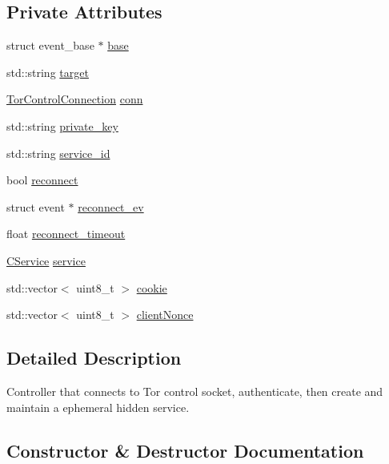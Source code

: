 \subsection*{Private Attributes}
\begin{DoxyCompactItemize}
\item 
struct event\+\_\+base $\ast$ \mbox{\hyperlink{class_tor_controller_a490cb6f1e683bbff4a6da80f054a1f14}{base}}
\item 
std\+::string \mbox{\hyperlink{class_tor_controller_ae082deff33f6f1db7e51825113c1adab}{target}}
\item 
\mbox{\hyperlink{class_tor_control_connection}{Tor\+Control\+Connection}} \mbox{\hyperlink{class_tor_controller_a0cd0abc08230a17743b1bfa22196a7ed}{conn}}
\item 
std\+::string \mbox{\hyperlink{class_tor_controller_aea1fe61c7404d74ccfaf1e875737e043}{private\+\_\+key}}
\item 
std\+::string \mbox{\hyperlink{class_tor_controller_a471e6bcf2090fd772503d22f3e028968}{service\+\_\+id}}
\item 
bool \mbox{\hyperlink{class_tor_controller_ab1d071e936a3d0060bad73e84cb9775b}{reconnect}}
\item 
struct event $\ast$ \mbox{\hyperlink{class_tor_controller_ab18e159e5ccad27e30c91ffad82edc89}{reconnect\+\_\+ev}}
\item 
float \mbox{\hyperlink{class_tor_controller_acb85d5d34fe9c86307d0a8730ce7cf1d}{reconnect\+\_\+timeout}}
\item 
\mbox{\hyperlink{class_c_service}{C\+Service}} \mbox{\hyperlink{class_tor_controller_aa460dee5c02e036c6784f64b4a3634e3}{service}}
\item 
std\+::vector$<$ uint8\+\_\+t $>$ \mbox{\hyperlink{class_tor_controller_aa5ab87c1c502c60ee2f3806f9380cbb5}{cookie}}
\item 
std\+::vector$<$ uint8\+\_\+t $>$ \mbox{\hyperlink{class_tor_controller_a56ee03f969e52fb735d2741565132968}{client\+Nonce}}
\end{DoxyCompactItemize}


\subsection{Detailed Description}
Controller that connects to Tor control socket, authenticate, then create and maintain a ephemeral hidden service. 

\subsection{Constructor \& Destructor Documentation}
\mbox{\label{class_tor_controller_ab38d90df15a9e3f2c6e1f4f24073a64e}} 
